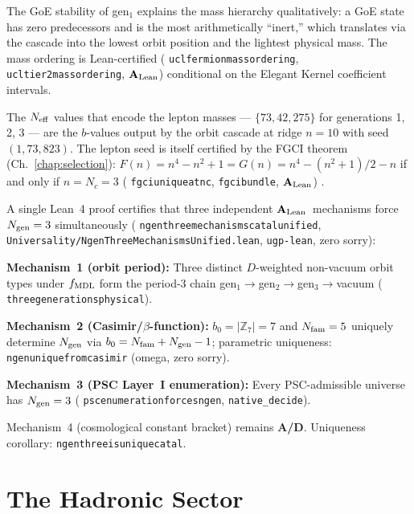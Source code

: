\documentclass[11pt,openany]{book}
\theoremstyle{remark}
\newcommand{\lean}[1]{%
  \penalty-100
  \begingroup\def\_{\textunderscore\allowbreak}\texttt{#1}\endgroup}
\newcommand{\Nc}{N_c}
\newcommand{\CatAL}{\ensuremath{\textbf{A}_{\rm Lean}}}
\newcommand{\CatAD}{\textbf{A/D}}
\begin{document}
The GoE stability of gen$_1$ explains the mass hierarchy qualitatively: a GoE state has
zero predecessors and is the most arithmetically ``inert,'' which translates via the
cascade into the lowest orbit position and the lightest physical mass.  The mass
ordering is Lean-certified (\lean{ucl\_fermion\_mass\_ordering}, \lean{ucl\_tier2\_mass\_ordering},
\CatAL) \cite{Spivack2025UGP} conditional on the Elegant Kernel coefficient intervals.

The $N_{\rm eff}$ values that encode the lepton masses --- $\{73, 42, 275\}$ for
generations 1, 2, 3 --- are the $b$-values output by the orbit cascade at ridge $n=10$
with seed $(1, 73, 823)$.  The lepton seed is itself certified by the FGCI theorem
(Ch.~\ref{chap:selection}): $F(n) = n^4 - n^2 + 1 = G(n) = n^4 - (n^2+1)/2 - n$ if
and only if $n = \Nc = 3$ (\lean{fgci\_unique\_at\_nc}, \lean{fgci\_bundle}, \CatAL)
\cite{SpivackGTEPolynomialUFT}.

\begin{tcolorbox}[colback=orange!5,colframe=orange!60,title={Theorem: $N_{\rm gen}=3$ Three-Mechanism Unified Certificate (\CatAL)}]
A single Lean~4 proof certifies that three independent \CatAL\ mechanisms force
$N_{\rm gen}=3$ simultaneously
(\lean{ngen\_three\_mechanisms\_catal\_unified},
\texttt{Universality/NgenThreeMechanismsUnified.lean}, \texttt{ugp-lean}, zero sorry):

\textbf{Mechanism~1 (orbit period):}
Three distinct $D$-weighted non-vacuum orbit types under $f_{\rm MDL}$ form the
period-3 chain gen${}_1\to$gen${}_2\to$gen${}_3\to$vacuum
(\lean{three\_generations\_physical}).

\textbf{Mechanism~2 (Casimir/$\beta$-function):}
$b_0 = |\mathbb{Z}_7|=7$ and $N_{\rm fam}=5$ uniquely determine $N_{\rm gen}$ via
$b_0=N_{\rm fam}+N_{\rm gen}-1$; parametric uniqueness: \lean{ngen\_unique\_from\_casimir}
(omega, zero sorry).

\textbf{Mechanism~3 (PSC Layer~I enumeration):}
Every PSC-admissible universe has $N_{\rm gen}=3$
(\lean{psc\_enumeration\_forces\_ngen\_3}, \texttt{native\_decide}).

Mechanism~4 (cosmological constant bracket) remains \CatAD.
Uniqueness corollary: \lean{ngen\_three\_is\_unique\_catal}.
\end{tcolorbox}

\section{The Hadronic Sector}
\label{sec:hadrons}
\end{document}
